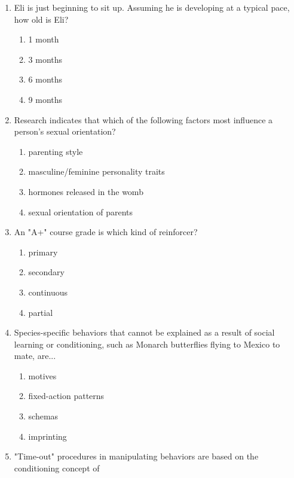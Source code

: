 \documentclass[12pt]{article}
\begin{document}
\begin{enumerate}[label=\arabic*.]
\begin{enumerate}[label=(\alph*)]
    \item the movement for the rights of the mentally ill.
    \item the creation of new medications.
    \item an improvement in psychotherapy.
\end{enumerate}
\item Eli is just beginning to sit up. Assuming he is developing at a typical pace, how old is Eli?
\begin{enumerate}[label=(\alph*)]
    \item 1 month
    \item 3 months
    \item 6 months
    \item 9 months
\end{enumerate}
\item Research indicates that which of the following factors most influence a person's sexual orientation?
\begin{enumerate}[label=(\alph*)]
    \item parenting style
    \item masculine/feminine personality traits
    \item hormones released in the womb
    \item sexual orientation of parents
\end{enumerate}
\item An "A+" course grade is which kind of reinforcer?
\begin{enumerate}[label=(\alph*)]
    \item primary
    \item secondary
    \item continuous
    \item partial
\end{enumerate}
\item Species-specific behaviors that cannot be explained as a result of social learning or conditioning, such as Monarch butterflies flying to Mexico to mate, are...
\begin{enumerate}[label=(\alph*)]
    \item motives
    \item fixed-action patterns
    \item schemas
    \item imprinting
\end{enumerate}
\item "Time-out" procedures in manipulating behaviors are based on the conditioning concept of

\end{enumerate}
\end{document}
